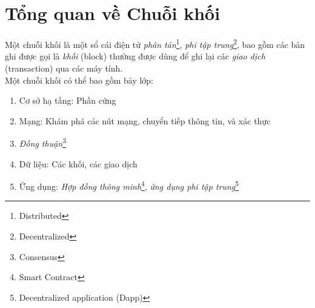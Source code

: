\section{Tổng quan về Chuỗi khối}
Một chuỗi khối là một sổ cái điện tử \textit{phân tán}\footnote{Distributed}, \textit{phi tập trung}\footnote{Decentralized}, bao gồm các bản ghi được gọi là \textit{khối} (block) thường được dùng để ghi lại các \textit{giao dịch} (transaction) qua các máy tính.\\

Một chuỗi khối có thể bao gồm bảy lớp:
\begin{enumerate}
    \item Cơ sở hạ tầng: Phần cứng
    \item Mạng: Khám phá các nút mạng, chuyển tiếp thông tin, và xác thực
    \item \textit{Đồng thuận}\footnote{Consensus}
    \item Dữ liệu: Các khối, các giao dịch
    \item Ứng dụng: \textit{Hợp đồng thông minh}\footnote{Smart Contract}, \textit{ứng dụng phi tập trung}\footnote{Decentralized application (Dapp)}
\end{enumerate}




